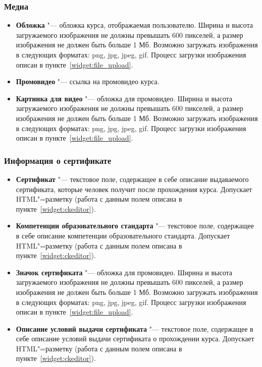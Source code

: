 \subsubsection{Медиа}
	\begin{itemize}
		\item \textbf{Обложка} "--- обложка курса, отображаемая пользователю. Ширина и высота загружаемого изображения не должны превышать 600 пикселей, а размер изображения не должен быть больше 1 Мб.
		Возможно загружать изображения в следующих форматах: png, jpg, jpeg, gif. Процесс загрузки изображения описан в пункте~\ref{widget:file_upload}.
		\item \textbf{Промовидео} "--- ссылка на промовидео курса.
		\item \textbf{Картинка для видео} "--- обложка для промовидео. Ширина и высота загружаемого изображения не должны превышать 600 пикселей, а размер изображения не должен быть больше 1 Мб. Возможно загружать изображения в следующих форматах: png, jpg, jpeg, gif. Процесс загрузки изображения описан в пункте~\ref{widget:file_upload}.
	\end{itemize}
\subsubsection{Информация о сертификате}
	\begin{itemize}
		\item \textbf{Сертификат} "--- текстовое поле, содержащее в себе описание выдаваемого сертификата, которые человек получит после прохождения курса. Допускает HTML"=разметку  (работа с данным полем описана в пункте~\ref{widget:ckeditor}).
		\item \textbf{Компетенции образовательного стандарта} "--- текстовое поле, содержащее в себе описание компетенции образовательного стандарта. Допускает HTML"=разметку (работа с данным полем описана в пункте~\ref{widget:ckeditor}).
		\item \textbf{Значок сертификата} "--- обложка для промовидео. Ширина и высота загружаемого изображения не должны превышать 600 пикселей, а размер изображения не должен быть больше 1 Мб. Возможно загружать изображения в следующих форматах: png, jpg, jpeg, gif. Процесс загрузки изображения описан в пункте~\ref{widget:file_upload}.
		\item \textbf{Описание условий выдачи сертификата} "--- текстовое поле, содержащее в себе описание условий выдачи сертификата о прохождении курса. Допускает HTML"=разметку (работа с данным полем описана в пункте~\ref{widget:ckeditor}).
	\end{itemize}
